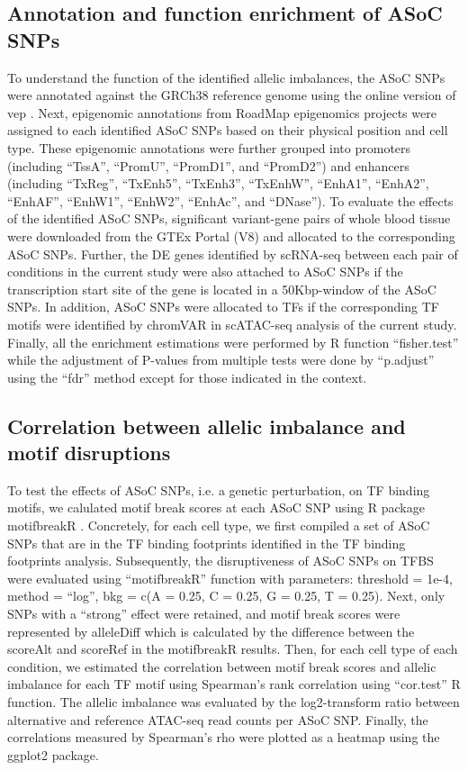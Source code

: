 \documentclass{book}
\begin{document}
\begin{refsection}
\subsection*{Annotation and function enrichment of ASoC SNPs}
To understand the function of the identified allelic imbalances, the ASoC SNPs were annotated against the GRCh38 reference genome using the online version of vep \cite{McLaren2016The}.
Next, epigenomic annotations from RoadMap epigenomics projects \cite{Kundaje2015Integrative} were assigned to each identified ASoC SNPs based on their physical position and cell type.
These epigenomic annotations were further grouped into promoters (including \enquote{TssA}, \enquote{PromU}, \enquote{PromD1}, and \enquote{PromD2}) and enhancers (including \enquote{TxReg}, \enquote{TxEnh5}, \enquote{TxEnh3}, \enquote{TxEnhW}, \enquote{EnhA1}, \enquote{EnhA2}, \enquote{EnhAF}, \enquote{EnhW1}, \enquote{EnhW2}, \enquote{EnhAc}, and \enquote{DNase}).
To evaluate the effects of the identified ASoC SNPs, significant variant-gene pairs of whole blood tissue were downloaded from the GTEx Portal (V8) and allocated to the corresponding ASoC SNPs.
Further, the DE genes identified by scRNA-seq between each pair of conditions in the current study were also attached to ASoC SNPs if the transcription start site of the gene is located in a 50Kbp-window of the ASoC SNPs.
In addition, ASoC SNPs were allocated to TFs if the corresponding TF motifs were identified by chromVAR in scATAC-seq analysis of the current study.
Finally, all the enrichment estimations were performed by R function \enquote{fisher.test} while the adjustment of P-values from multiple tests were done by \enquote{p.adjust} using the \enquote{fdr} method except for those indicated in the context.
 
\subsection*{Correlation between allelic imbalance and motif disruptions}
To test the effects of ASoC SNPs, i.e. a genetic perturbation, on TF binding motifs, we calulated motif break scores at each ASoC SNP using R package motifbreakR \cite{Coetzee2015motifbreakR}.
Concretely, for each cell type, we first compiled a set of ASoC SNPs that are in the TF binding footprints identified in the TF binding footprints analysis.
Subsequently, the disruptiveness of ASoC SNPs on TFBS were evaluated using \enquote{motifbreakR} function with parameters: threshold = 1e-4, method = \enquote{log}, bkg = c(A = 0.25, C = 0.25, G = 0.25, T = 0.25).
Next, only SNPs with a “strong” effect were retained, and motif break scores were represented by alleleDiff which is calculated by the difference between the scoreAlt and scoreRef in the motifbreakR results.
Then, for each cell type of each condition, we estimated the correlation between motif break scores and allelic imbalance for each TF motif using Spearman’s rank correlation using \enquote{cor.test} R function.
The allelic imbalance was evaluated by the log2-transform ratio between alternative and reference ATAC-seq read counts per ASoC SNP.
Finally, the correlations measured by Spearman’s rho were plotted as a heatmap using the ggplot2 package.


\end{refsection}
\end{document}
